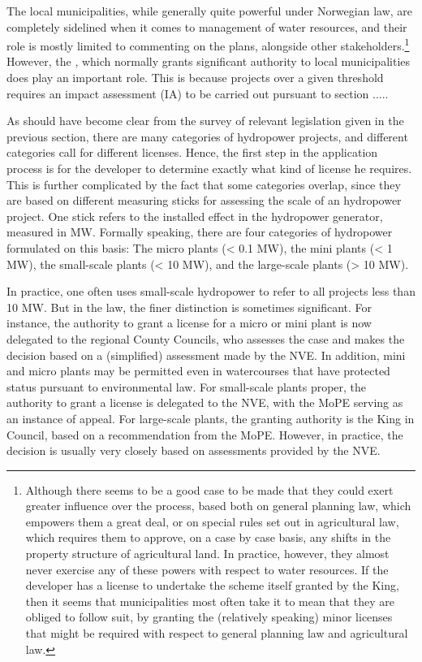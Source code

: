 The local municipalities, while generally quite powerful under Norwegian law, are completely sidelined when it comes to management of water resources, and their role is mostly limited to commenting on the plans, alongside other stakeholders.\footnote{Although there seems to be a good case to be made that they could exert greater influence over the process, based both on general planning law, which empowers them a great deal, or on special rules set out in agricultural law, which requires them to approve, on a case by case basis, any shifts in the property structure of agricultural land. In practice, however, they almost never exercise any of these powers with respect to water resources. If the developer has a license to undertake the scheme itself granted by the King, then it seems that municipalities most often take it to mean that they are obliged to follow suit, by granting the (relatively speaking) minor licenses that might be required with respect to general planning law and agricultural law.} However, the \cite{pba..}, which normally grants significant authority to local municipalities does play an important role. This is because projects over a given threshold requires an impact assessment (IA) to be carried out pursuant to section .....

As should have become clear from the survey of relevant legislation given in the previous section, there are many categories of hydropower projects, and different categories call for different licenses. Hence, the first step in the application process is for the developer to determine exactly what kind of license he requires. This is further complicated by the fact that some categories overlap, since they are based on different measuring sticks for assessing the scale of an hydropower project. One stick refers to the installed effect in the hydropower generator, measured in MW. Formally speaking, there are four categories of hydropower formulated on this basis: The micro plants (< 0.1 MW), the mini plants (< 1 MW), the small-scale plants (< 10 MW), and the large-scale plants (> 10 MW). 

In practice, one often uses small-scale hydropower to refer to all projects less than 10 MW. But in the law, the finer distinction is sometimes significant. For instance, the authority to grant a license for a micro or mini plant is now delegated to the regional County Councils, who assesses the case and makes the decision based on a (simplified) assessment made by the NVE. In addition, mini and micro plants may be permitted even in watercourses that have protected status pursuant to environmental law. For small-scale plants proper, the authority to grant a license is delegated to the NVE, with the MoPE serving as an instance of appeal. For large-scale plants, the granting authority is the King in Council, based on a recommendation from the MoPE. However, in practice, the decision is usually very closely based on assessments provided by the NVE.

